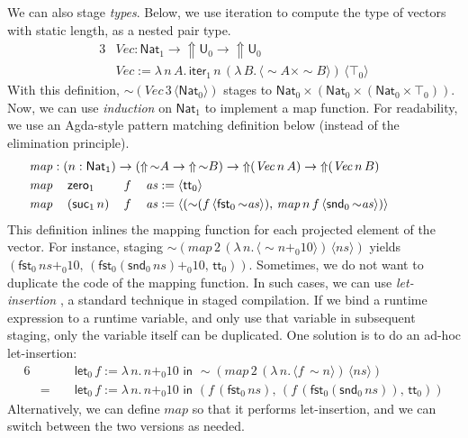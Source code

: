 \documentclass[acmsmall]{acmart}
\newcommand{\mit}[1]{\mathit{#1}}
\newcommand{\msf}[1]{\mathsf{#1}}
\newcommand{\Lift}{{\Uparrow}}
\newcommand{\spl}{{\sim}}
\newcommand{\qut}[1]{\langle #1\rangle}
\renewcommand{\U}{\msf{U}}
\newcommand{\Nat}{\msf{Nat}}
\newcommand{\zero}{\msf{zero}}
\newcommand{\suc}{\msf{suc}}
\renewcommand{\tt}{\msf{tt}}
\newcommand{\fst}{\msf{fst}}
\newcommand{\snd}{\msf{snd}}
\newcommand{\mylet}{\msf{let}}
\theoremstyle{remark}
\begin{document}
We can also stage \emph{types}. Below, we use iteration to compute the type of
vectors with static length, as a nested pair type.
\begin{alignat*}{3}
  &\mit{Vec} : \Nat_1 \to \Lift \U_0 \to \Lift \U_0\\
  &\mit{Vec} := \lambda\,n\,A.\,\msf{iter}_1\,n\,(\lambda\,B.\,\qut{\spl A \times \spl B})\,\qut{\top_0}
\end{alignat*}
With this definition, $\spl(\mit{Vec}\,3\,\qut{\Nat_0})$ stages to $\Nat_0
\times (\Nat_0 \times (\Nat_0 \times \top_0))$. Now, we can use \emph{induction}
on $\Nat_1$ to implement a map function. For readability, we use an Agda-style
pattern matching definition below (instead of the elimination principle).
\begin{alignat*}{6}
  &\hspace{-3em}\rlap{$\mit{map} : (n : \Nat_1) \to (\Lift\,\spl A \to \Lift\,\spl B) \to \Lift(\mit{Vec}\,n\,A) \to \Lift(\mit{Vec}\,n\,B)$}\\
  &\hspace{-3em}\mit{map}\,&&\zero_1      && f\,&&\mit{as} := \qut{\tt_0}\\
  &\hspace{-3em}\mit{map}\,&&(\suc_1\,n)\,&& f\,&&\mit{as} :=
     \qut{(\spl(f\,\qut{\fst_0\,\spl\mit{as}}),\,\mit{map}\,n\,f\,\qut{\snd_0\,\spl \mit{as}})}
\end{alignat*}
This definition inlines the mapping function for each projected element of the
vector. For instance, staging $\spl(\mit{map}\,2\,(\lambda\,n.\,\qut{\spl n +_0
  10})\,\qut{\mit{ns}})$ yields $(\fst_0\,\mit{ns} +_0
10,\,(\fst_0(\snd_0\,\mit{ns}) +_0 10,\,\tt_0))$. Sometimes, we do not want to
duplicate the code of the mapping function. In such cases, we can use
\emph{let-insertion} \cite{TODO}, a standard technique in staged compilation. If
we bind a runtime expression to a runtime variable, and only use that variable
in subsequent staging, only the variable itself can be duplicated. One solution
is to do an ad-hoc let-insertion:
\begin{alignat*}{6}
  &   && \mylet_0\,f := \lambda\,n.\, n +_0 10\,\,\msf{in}\,\,
         \spl(\mit{map}\,2\,(\lambda\,n.\,\qut{f\,\spl n})\,\qut{\mit{ns}}) \\
  & =\,\,&&  \mylet_0\,f := \lambda\,n.\, n +_0 10\,\,\msf{in}\,\,
          (f\,(\fst_0\,\mit{ns}),\,(f\,(\fst_0(\snd_0\,\mit{ns})),\,\tt_0))
\end{alignat*}
 Alternatively, we can define $\mit{map}$ so that it performs let-insertion, and
 we can switch between the two versions as needed.
\end{document}
